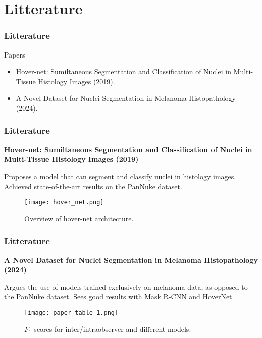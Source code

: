 \documentclass[../main.tex]{subfiles}
\begin{document}
\section{Litterature}
\begin{frame}[c]
    \frametitle{Litterature}

    \begin{block}{Papers}
        \begin{itemize}
            \item Hover-net: Sumiltaneous Segmentation and Classification of Nuclei in Multi-Tissue Histology Images (2019).
            \item A Novel Dataset for Nuclei Segmentation in Melanoma Histopathology (2024).
        \end{itemize}
    \end{block}
\end{frame}

\begin{frame}[t]
    \frametitle{Litterature}
    \textbf{Hover-net: Sumiltaneous Segmentation and Classification of Nuclei in Multi-Tissue Histology Images (2019)}

    \vspace{20pt}
    Proposes a model that can segment and classify nuclei in histology images. Achieved state-of-the-art results on the PanNuke dataset.

    \begin{figure}[h]
        \centering
        \texttt{[image: hover\_net.png]}
        \caption{Overview of hover-net architecture.}
    \end{figure}
\end{frame}

\begin{frame}[t]
    \frametitle{Litterature}
    \textbf{A Novel Dataset for Nuclei Segmentation in Melanoma Histopathology (2024)}

    \vspace{20pt}
    Argues the use of models trained exclusively on melanoma data, as opposed to the PanNuke dataset. Sees good results with Mask R-CNN and HoverNet.

    \begin{figure}[h]
        \centering
        \texttt{[image: paper\_table\_1.png]}
        \caption{$F_1$ scores for inter/intraobserver and different models.}
    \end{figure}
\end{frame}
\end{document}
